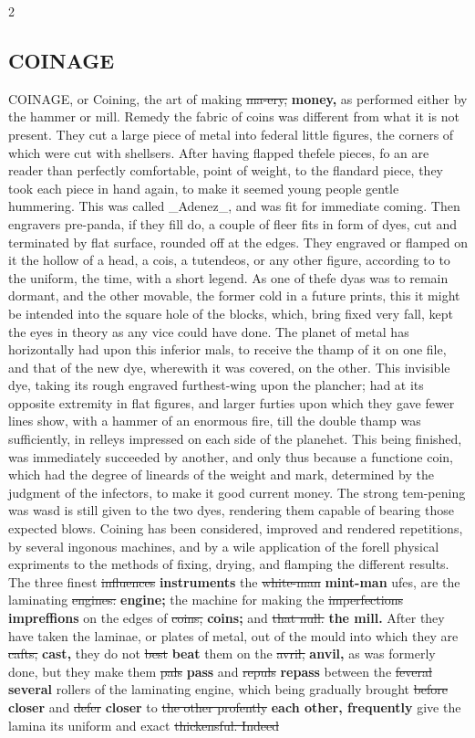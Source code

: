 \documentclass[10pt]{article}
\begin{document}
\begin{multicols}{2}
\subsection*{COINAGE}
COINAGE, or Coining, the art of making \sout{ma-ery,} \textbf{money,} as performed either by the hammer or mill. Remedy the fabric of coins was different from what it is not present. They cut a large piece of metal into federal little figures, the corners of which were cut with shellsers. After having flapped thefele pieces, fo an are reader than perfectly comfortable, point of weight, to the flandard piece, they took each piece in hand again, to make it seemed young people gentle hummering. This was called \_Adenez\_, and was fit for immediate coming. Then engravers pre-panda, if they fill do, a couple of fleer fits in form of dyes, cut and terminated by flat surface, rounded off at the edges. They engraved or flamped on it the hollow of a head, a cois, a tutendeos, or any other figure, according to to the uniform, the time, with a short legend. As one of thefe dyas was to remain dormant, and the other movable, the former cold in a future prints, this it might be intended into the square hole of the blocks, which, bring fixed very fall, kept the eyes in theory as any vice could have done. The planet of metal has horizontally had upon this inferior mals, to receive the thamp of it on one file, and that of the new dye, wherewith it was covered, on the other. This invisible dye, taking its rough engraved furthest-wing upon the plancher; had at its opposite extremity in flat figures, and larger furties upon which they gave fewer lines show, with a hammer of an enormous fire, till the double thamp was sufficiently, in relleys impressed on each side of the planehet. This being finished, was immediately succeeded by another, and only thus because a functione coin, which had the degree of lineards of the weight and mark, determined by the judgment of the infectors, to make it good current money. The strong tem-pening was wasd is still given to the two dyes, rendering them capable of bearing those expected blows. Coining has been considered, improved and rendered repetitions, by several ingonous machines, and by a wile application of the forell physical expriments to the methods of fixing, drying, and flamping the different results. The three finest \sout{influences} \textbf{instruments} the \sout{white-man} \textbf{mint-man} ufes, are the laminating \sout{engines:} \textbf{engine;} the machine for making the \sout{imperfections} \textbf{impreffions} on the edges of \sout{coins,} \textbf{coins;} and \sout{that null.} \textbf{the mill.} After they have taken the laminae, or plates of metal, out of the mould into which they are \sout{cafts,} \textbf{cast,} they do not \sout{best} \textbf{beat} them on the \sout{avril,} \textbf{anvil,} as was formerly done, but they make them \sout{pals} \textbf{pass} and \sout{repuls} \textbf{repass} between the \sout{feveral} \textbf{several} rollers of the laminating engine, which being gradually brought \sout{before} \textbf{closer} and \sout{defer} \textbf{closer} to \sout{the other profently} \textbf{each other, frequently} give the lamina its uniform and exact \sout{thickensful. Indeed} 
\end{multicols}
\end{document}
